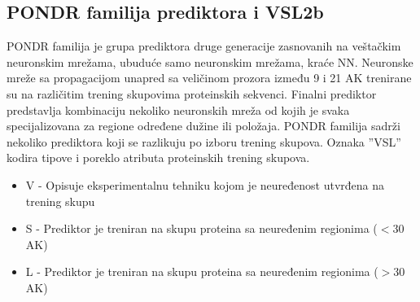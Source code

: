 %
%
%
%
%


\subsection{PONDR familija prediktora i VSL2b}
\label{VSL2b}

PONDR familija  je grupa
prediktora druge generacije zasnovanih na veštačkim neuronskim mrežama, ubuduće
samo neuronskim mrežama, kraće NN.
Neuronske mreže sa propagacijom unapred  sa veličinom
prozora između 9 i 21 AK trenirane su na različitim trening skupovima
proteinskih sekvenci.  Finalni prediktor predstavlja kombinaciju nekoliko
neuronskih mreža od kojih je svaka specijalizovana za regione određene dužine
ili položaja.  PONDR familija sadrži nekoliko prediktora koji  se razlikuju 
po izboru trening skupova.
Oznaka ''VSL'' kodira tipove i poreklo atributa proteinskih trening skupova.
\begin{itemize}
  \item V - Opisuje eksperimentalnu tehniku kojom je neuređenost utvrđena na
    trening skupu 
  \item S - Prediktor je treniran na skupu proteina sa 
      neuređenim regionima ($<30$ AK)
  \item L - Prediktor je treniran na skupu proteina sa 
    neuređenim regionima ($>30$ AK)
\end{itemize}

